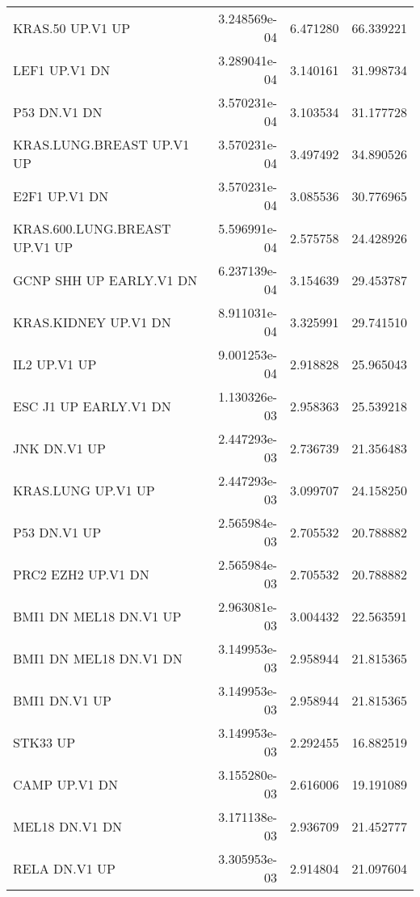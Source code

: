 \begin{tabular}{lrrr}
                  KRAS.50 UP.V1 UP &      3.248569e-04 &  6.471280 &       66.339221 \\
                     LEF1 UP.V1 DN &      3.289041e-04 &  3.140161 &       31.998734 \\
                      P53 DN.V1 DN &      3.570231e-04 &  3.103534 &       31.177728 \\
         KRAS.LUNG.BREAST UP.V1 UP &      3.570231e-04 &  3.497492 &       34.890526 \\
                     E2F1 UP.V1 DN &      3.570231e-04 &  3.085536 &       30.776965 \\
     KRAS.600.LUNG.BREAST UP.V1 UP &      5.596991e-04 &  2.575758 &       24.428926 \\
           GCNP SHH UP EARLY.V1 DN &      6.237139e-04 &  3.154639 &       29.453787 \\
              KRAS.KIDNEY UP.V1 DN &      8.911031e-04 &  3.325991 &       29.741510 \\
                      IL2 UP.V1 UP &      9.001253e-04 &  2.918828 &       25.965043 \\
             ESC J1 UP EARLY.V1 DN &      1.130326e-03 &  2.958363 &       25.539218 \\
                      JNK DN.V1 UP &      2.447293e-03 &  2.736739 &       21.356483 \\
                KRAS.LUNG UP.V1 UP &      2.447293e-03 &  3.099707 &       24.158250 \\
                      P53 DN.V1 UP &      2.565984e-03 &  2.705532 &       20.788882 \\
                PRC2 EZH2 UP.V1 DN &      2.565984e-03 &  2.705532 &       20.788882 \\
            BMI1 DN MEL18 DN.V1 UP &      2.963081e-03 &  3.004432 &       22.563591 \\
            BMI1 DN MEL18 DN.V1 DN &      3.149953e-03 &  2.958944 &       21.815365 \\
                     BMI1 DN.V1 UP &      3.149953e-03 &  2.958944 &       21.815365 \\
                          STK33 UP &      3.149953e-03 &  2.292455 &       16.882519 \\
                     CAMP UP.V1 DN &      3.155280e-03 &  2.616006 &       19.191089 \\
                    MEL18 DN.V1 DN &      3.171138e-03 &  2.936709 &       21.452777 \\
                     RELA DN.V1 UP &      3.305953e-03 &  2.914804 &       21.097604 \\

\end{tabular}
